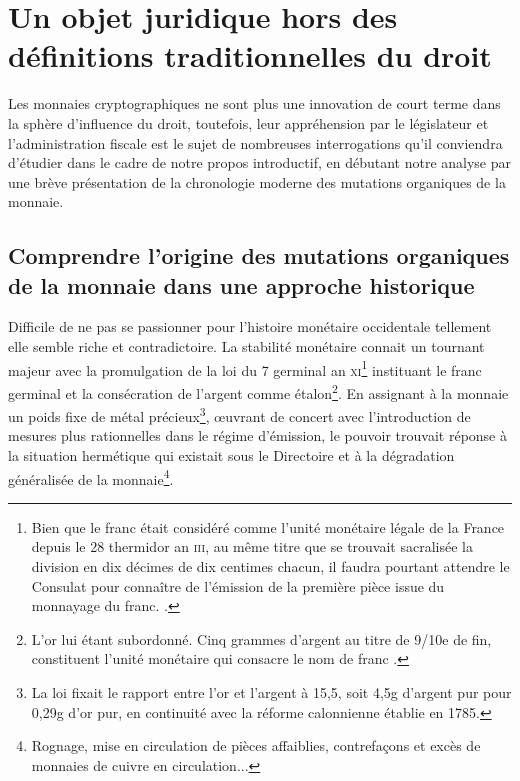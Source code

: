 {\section{Un objet juridique hors des définitions traditionnelles du droit}
 
Les monnaies cryptographiques ne sont plus une innovation de court terme  dans la sphère d'influence du droit, toutefois, leur appréhension par le législateur et l'administration fiscale est le sujet de nombreuses interrogations qu'il conviendra d'étudier dans le cadre de notre propos introductif, en débutant notre analyse par une brève présentation de la chronologie moderne des mutations organiques de la monnaie.\par
 
\subsection{Comprendre l'origine des mutations organiques de la monnaie dans une approche historique}

Difficile de ne pas se passionner pour l'histoire monétaire occidentale tellement elle semble riche et contradictoire. La stabilité monétaire connait un tournant majeur avec la promulgation de la loi du 7 germinal an \textsc{xi}\footnote{Bien que le franc était considéré comme l'unité monétaire légale de la France depuis le 28 thermidor an \textsc{iii}, au même titre que se trouvait sacralisée la division en dix décimes de dix centimes chacun, il faudra pourtant attendre le Consulat pour connaître de l'émission de la première pièce issue du monnayage du franc. .} instituant le franc germinal et la consécration de l'argent comme étalon\footnote{L'or lui étant subordonné. \og Cinq grammes d'argent au titre de 9/10e de fin, constituent l'unité monétaire qui consacre le nom de franc \fg{}.}. En assignant à la monnaie un poids fixe de métal précieux\footnote{La loi fixait le rapport entre l'or et l'argent à 15,5, soit 4,5g d'argent pur pour 0,29g d'or pur, en continuité avec la réforme calonnienne établie en 1785.}, \oe{}uvrant de concert avec l'introduction de mesures plus rationnelles dans le régime d'émission, le pouvoir trouvait réponse à la situation hermétique  qui existait sous le Directoire et à la dégradation généralisée de la monnaie\footnote{Rognage, mise en circulation de pièces affaiblies, contrefaçons et excès de monnaies de cuivre en circulation...}.\par

}
